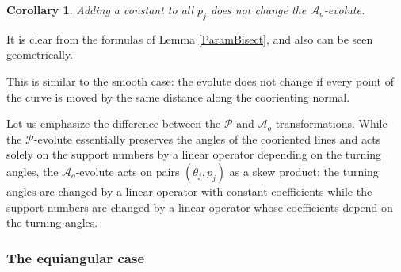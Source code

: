 \documentclass[12pt]{article}
\makeatletter
\newtheorem{corollary}[lemma]{Corollary}
\renewenvironment{proof}[1][\proofname] 
{\par\pushQED{\qed}\normalfont\topsep6\p@\@plus6\p@\relax\trivlist\item[\hskip\labelsep\bfseries#1\@addpunct{.}]\ignorespaces}{\popQED\endtrivlist\@endpefalse}
\newcommand{\Pev}{\mathcal{P}}
\newcommand{\Aeo}{\mathcal{A}_o}
\makeatother
\begin{document}
\begin{corollary}
Adding a constant to all $p_j$ does not change the $\Aeo$-evolute.
\end{corollary}
\begin{proof}
It is clear from the formulas of Lemma \ref{ParamBisect}, and also can be seen geometrically.
\end{proof}

This is similar to the smooth case: the evolute does not change if every point of the curve is moved by the same distance along the coorienting normal. 

Let us emphasize  the difference between the $\Pev$ and $\Aeo$ transformations. While the $\Pev$-evolute essentially preserves the angles of the cooriented lines and acts solely on the support numbers by a linear operator depending on the turning angles, the $\Aeo$-evolute acts on pairs $(\theta_j, p_j)$ as a skew product: the turning angles are changed by a linear operator with constant coefficients while the support numbers are changed by a linear operator whose coefficients depend on the turning angles.

\subsubsection{The equiangular case}\label{equiangularAo}
\end{document}
